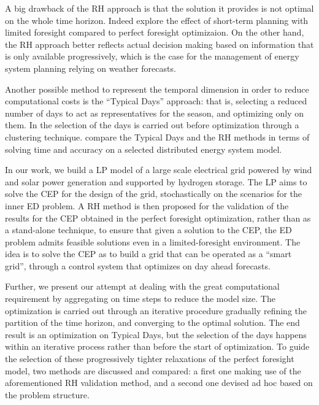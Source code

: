 \documentclass[smallextended,natbib]{svjour3}       %
\numberwithin{definition}{section}
\numberwithin{theorem}{section}
\numberwithin{proposition}{section}
\begin{document}
A big drawback of the RH approach is that the solution it provides is not optimal on the whole time horizon. 
Indeed \citet{INTRO_short-term} explore the effect of short-term planning with limited foresight compared to perfect foresight optimizaion. 
On the other hand, the RH approach better reflects actual decision making based on information that is only available
 progressively, which is the case for the management of energy system planning relying on weather forecasts.

 Another possible method to represent the temporal dimension in order to reduce computational costs is the ``Typical Days'' approach: 
 that is, selecting a reduced number of days to act as representatives for the season, and optimizing only on them. In \citet{TD_clustering} the selection of the days is carried out before optimization through a clustering technique.
 \citet{RH_vs_TD} compare the Typical Days and the RH methods in terms of solving time and accuracy on a selected distributed energy system model.

In our work, we build a LP model of a large scale electrical grid powered by wind and solar power generation and supported
 by hydrogen storage. 
The LP aims to solve the CEP for the design of the grid, stochastically on the scenarios for the inner ED problem. 
A RH method is then proposed for the validation of the results for the CEP obtained in the perfect foresight optimization, rather than as a 
stand-alone technique, to ensure that given a solution to the CEP, the ED problem admits feasible solutions even in a limited-foresight environment. 
The idea is to solve the CEP as to build a grid that can be operated as a ``smart grid'', through a control system that
 optimizes on day ahead forecasts.

 Further, we present our attempt at dealing with the great computational requirement by aggregating on time steps to reduce the model size. 
 The optimization is carried out through an iterative procedure gradually refining the partition of the time horizon, and converging to the optimal solution. 
 The end result is an optimization on Typical Days, but the selection of the days happens within an iterative process rather than before the start of optimization.
To guide the selection of these progressively tighter relaxations of the perfect foresight model, two methods are discussed and compared:
a first one making use of the aforementioned RH validation method, and a second one devised ad hoc based on the problem structure.
\end{document}
